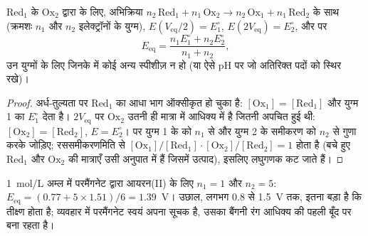 \begin{proposition}\label{prop:b1:titration-methods:potentiometric-points}
$\mathrm{Red_1}$ के $\mathrm{Ox_2}$ द्वारा  के लिए, अभिक्रिया
$n_2\,\mathrm{Red_1} + n_1\,\mathrm{Ox_2} \to n_2\,\mathrm{Ox_1} +
n_1\,\mathrm{Red_2}$ के साथ (क्रमशः $n_1$ और $n_2$ इलेक्ट्रॉनों के युग्म), $E(V_{\mathrm{eq}}/2) = E^\circ_1$, $E(2V_{\mathrm{eq}}) =
E^\circ_2$, और  पर
\[
  E_{\mathrm{eq}} = \frac{n_1E^\circ_1 + n_2E^\circ_2}{n_1 + n_2},
\]
उन युग्मों के लिए जिनके  में कोई अन्य स्पीशीज़ न हो (या ऐसे pH पर
जो अतिरिक्त पदों को स्थिर रखे)।
\end{proposition}

\begin{proof}
अर्ध-तुल्यता पर $\mathrm{Red_1}$ का आधा भाग ऑक्सीकृत हो चुका है:
$[\mathrm{Ox_1}] = [\mathrm{Red_1}]$ और युग्म 1 का 
$E^\circ_1$ देता है। $2V_{\mathrm{eq}}$ पर $\mathrm{Ox_2}$ उतनी ही मात्रा में आधिक्य में है
जितनी अपचित हुई थी: $[\mathrm{Ox_2}] = [\mathrm{Red_2}]$, $E = E^\circ_2$।
 पर युग्म 1 के  को $n_1$ से और
युग्म 2 के समीकरण को $n_2$ से गुणा करके जोड़िए; रससमीकरणमिति से
$[\mathrm{Ox_1}]/[\mathrm{Red_1}] \cdot [\mathrm{Ox_2}]/[\mathrm{Red_2}] = 1$ होता है
(बचे हुए $\mathrm{Red_1}$ और $\mathrm{Ox_2}$ की मात्राएँ उसी
अनुपात में हैं जिसमें उत्पाद), इसलिए लघुगणक कट जाते हैं।
\end{proof}

\qty{1}{mol/L} अम्ल में परमैंगनेट द्वारा आयरन(II) के लिए $n_1 = 1$ और $n_2 =
5$: $E_{\mathrm{eq}} = (0.77 + 5 \times 1.51)/6 = 1.39$~V। उछाल, लगभग
0.8 से 1.5~V तक, इतना बड़ा है कि  तीक्ष्ण होता है; व्यवहार में
परमैंगनेट स्वयं अपना सूचक है, उसका बैंगनी रंग आधिक्य की पहली बूँद पर
बना रहता है।

